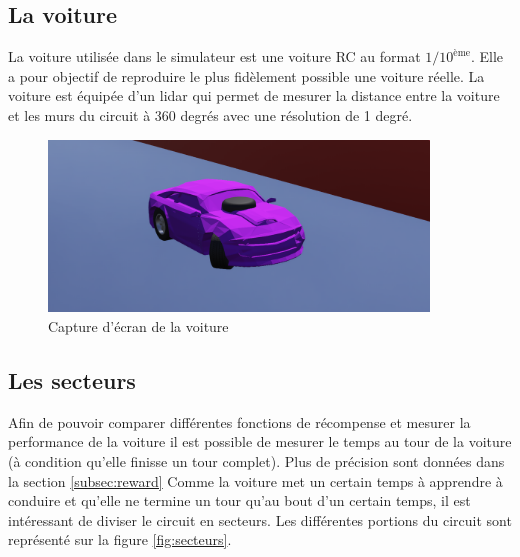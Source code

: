 \documentclass[french]{article}
\begin{document}
\subsection{La voiture}
La voiture utilisée dans le simulateur est une voiture RC au format $1/10^{\text{ème}}$. Elle a pour objectif de
reproduire le plus fidèlement possible une voiture réelle. La voiture est équipée d'un lidar qui permet de mesurer la
distance entre la voiture et les murs du circuit à 360 degrés avec une résolution de 1 degré.

\begin{figure}[H]
    \centering
    \includegraphics[width=0.9\textwidth]{Images/Voiture.png}
    \caption{Capture d'écran de la voiture}
\end{figure}

\subsection{Les secteurs}

Afin de pouvoir comparer différentes fonctions de récompense et mesurer la performance de la voiture il est possible de mesurer le temps au tour de la voiture (à condition qu'elle finisse un tour complet). Plus de précision sont données dans la section \ref{subsec:reward} Comme la voiture met un certain temps à apprendre à conduire et qu'elle ne termine un tour qu'au bout d'un certain temps, il est intéressant de diviser le circuit en secteurs. Les différentes portions du circuit sont représenté sur la figure \ref{fig:secteurs}.
\end{document}
